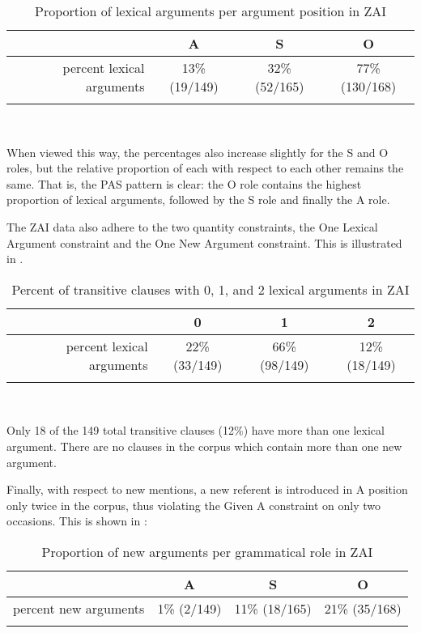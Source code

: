 \begin{table}

\caption{{Proportion of lexical arguments per argument position in ZAI}}
\begin{tabular}{ r  c  c  c }
\lsptoprule
 & A & S & O \\

\midrule
 percent lexical arguments  &  13{\%} (19/149) &  32{\%} (52/165) &  77{\%} (130/168)  \\
  
\lspbottomrule
\end{tabular}\\
\label{proportionlexical}

\end{table}
When viewed this way, the percentages also increase slightly for the S and O roles, but the relative proportion of each with respect to each other remains the same. That is, the PAS pattern is clear: the O role contains the highest proportion of lexical arguments, followed by the S role and finally the A role.

The ZAI data also adhere to the two quantity constraints, the One Lexical Argument constraint and the One New Argument constraint. This is illustrated in .

\begin{table}

\caption{{Percent of transitive clauses with 0, 1, and 2 lexical arguments in ZAI}}
\begin{tabular}{ r  c  c  c }
\lsptoprule
 & 0  & 1  & 2 \\

\midrule
percent lexical arguments & 22{\%} (33/149) & 66{\%} (98/149) &  12{\%} (18/149)  \\
  
\lspbottomrule
\end{tabular}\\
\label{percenttrans}
\end{table}
Only 18 of the 149 total transitive clauses (12{\%}) have more than one lexical argument. There are no clauses in the corpus which contain more than one new argument. 

Finally, with respect to new mentions, a new referent is introduced in A position only twice in the corpus, thus violating the Given A constraint on only two occasions. This is shown in :

\begin{table}

\caption{{Proportion of new arguments per grammatical role in ZAI}}
\begin{tabular}{ r  c  c  c }
\lsptoprule
 & A & S & O \\

\midrule
 percent new arguments &  1{\%} (2/149) &  11{\%} (18/165) & 21{\%} (35/168) \\
  
\lspbottomrule
\end{tabular}\\
\label{proportionnew}

\end{table}

